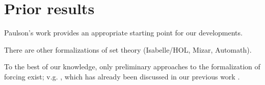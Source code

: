 \section{Prior results}

Paulson's work provides an appropriate starting point for our
developments.

There are other formalizations of set theory (Isabelle/HOL, Mizar, Automath).

To the best of our knowledge, only preliminary approaches to the
formalization of forcing exist; v.g. \cite{Quirin}, which has already been
discussed in our previous work \cite{2018arXiv180705174G}. 

